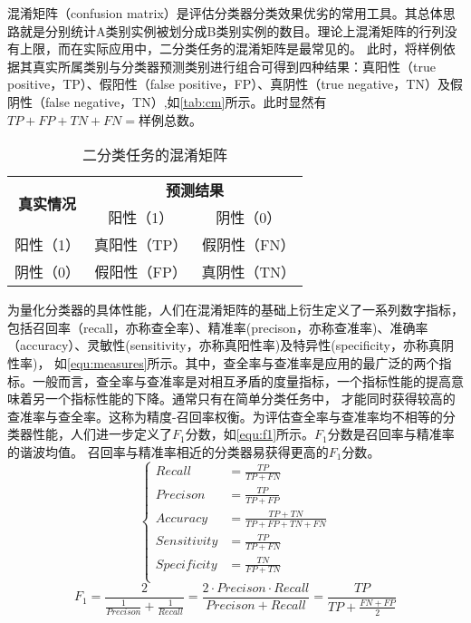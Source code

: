 混淆矩阵（confusion matrix）是评估分类器分类效果优劣的常用工具\cite{Zhou2016,Aurélien2018}。其总体思路就是分别统计A类别实例被划分成B类别实例的数目。理论上混淆矩阵的行列没有上限，而在实际应用中，二分类任务的混淆矩阵是最常见的。
此时，将样例依据其真实所属类别与分类器预测类别进行组合可得到四种结果：真阳性（true positive，TP）、假阳性（false positive，FP）、真阴性（true negative，TN）及假阴性（false negative，TN）,如\autoref{tab:cm}所示。此时显然有
$TP+FP+TN+FN=\text{样例总数}$。
\begin{table}[htbp]
      \centering
      \caption{\label{tab:cm}二分类任务的混淆矩阵}
      \begin{tabular}{ccc}
      \toprule
      \multicolumn{1}{c}{\multirow{2}[4]{*}{\textbf{真实情况}}} & \multicolumn{2}{c}{\textbf{预测结果}} \\
            \cmidrule{2-3}          & 阳性（1） & 阴性（0） \\
      \midrule
      阳性（1） & 真阳性（TP） & 假阴性（FN） \\
      阴性（0） & 假阳性（FP） & 真阴性（TN） \\
      \bottomrule
      \end{tabular}%
\end{table}%

为量化分类器的具体性能，人们在混淆矩阵的基础上衍生定义了一系列数字指标，包括召回率（recall，亦称查全率）、精准率(precison，亦称查准率)、准确率（accuracy）、灵敏性(sensitivity，亦称真阳性率)及特异性(specificity，亦称真阴性率)，
如\autoref{equ:measures}所示。其中，查全率与查准率是应用的最广泛的两个指标\cite{Zhou2016,Aurélien2018}。一般而言，查全率与查准率是对相互矛盾的度量指标，一个指标性能的提高意味着另一个指标性能的下降。通常只有在简单分类任务中，
才能同时获得较高的查准率与查全率。这称为精度-召回率权衡。为评估查全率与查准率均不相等的分类器性能，人们进一步定义了$F_1\text{分数}$，如\autoref{equ:f1}所示。$F_1\text{分数}$是召回率与精准率的谐波均值。
召回率与精准率相近的分类器易获得更高的$F_1\text{分数}$。
\begin{equation}
      \label{equ:measures}
      \left \{
      \begin{aligned}
            Recall      &=\frac{TP}{TP+FN}            \\
            Precison    &=\frac{TP}{TP+FP}          \\
            Accuracy    &=\frac{TP+TN}{TP+FP+TN+FN} \\
            Sensitivity &=\frac{TP}{TP+FN}       \\
            Specificity &=\frac{TN}{FP+TN}       \\
      \end{aligned}
      \right.
\end{equation}
\begin{equation}
      \label{equ:f1}
      F_1=\frac{2}{\frac{1}{Precison}+\frac{1}{Recall}}=\frac{2\cdot Precison\cdot Recall}{Precison+Recall}=\frac{TP}{TP+\frac{FN+FP}{2}}
\end{equation}

